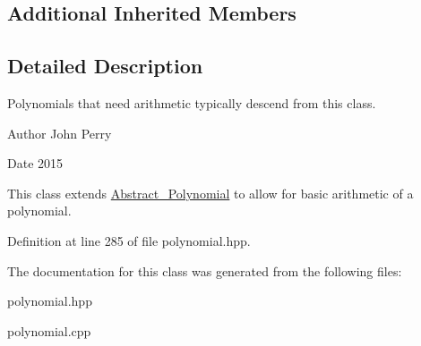 \subsection*{Additional Inherited Members}


\subsection{Detailed Description}
Polynomials that need arithmetic typically descend from this class. 

\begin{DoxyAuthor}{Author}
John Perry 
\end{DoxyAuthor}
\begin{DoxyDate}{Date}
2015
\end{DoxyDate}
This class extends \hyperlink{class_abstract___polynomial}{Abstract\+\_\+\+Polynomial} to allow for basic arithmetic of a polynomial. 

Definition at line 285 of file polynomial.\+hpp.



The documentation for this class was generated from the following files\+:\begin{DoxyCompactItemize}
\item 
polynomial.\+hpp\item 
polynomial.\+cpp\end{DoxyCompactItemize}
